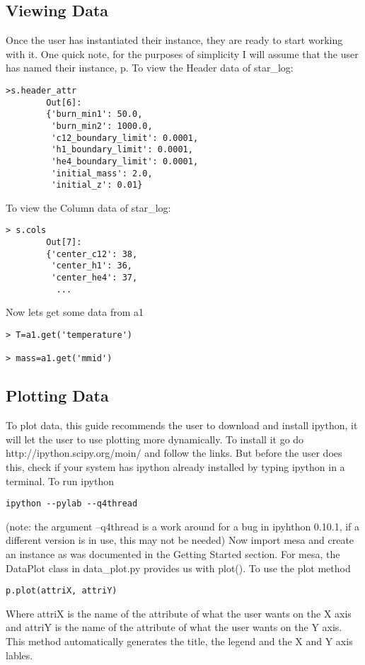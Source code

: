 \subsection{Viewing Data}
Once the user has instantiated their instance, they are ready to start working with it.
One quick note, for the purposes of simplicity I will assume that the user has named
their instance, p.
\newline
To view the Header data of star\_log:
\begin{verbatim}
>s.header_attr
        Out[6]: 
        {'burn_min1': 50.0,
         'burn_min2': 1000.0,
         'c12_boundary_limit': 0.0001,
         'h1_boundary_limit': 0.0001,
         'he4_boundary_limit': 0.0001,
         'initial_mass': 2.0,
         'initial_z': 0.01}
\end{verbatim}
To view the Column data of star\_log:
\begin{verbatim}
> s.cols
        Out[7]: 
        {'center_c12': 38,
         'center_h1': 36,
         'center_he4': 37,
          ...
\end{verbatim}
Now lets get some data from a1
\begin{verbatim}
> T=a1.get('temperature')

> mass=a1.get('mmid')
\end{verbatim}
\subsection{Plotting Data}
To plot data, this guide recommends the user to download and install ipython, it will let the user to use plotting more dynamically. To install it go do http://ipython.scipy.org/moin/ and follow the links.
But before the user does this, check if your system has ipython already installed by typing ipython in a terminal.
\newline
To run ipython
\begin{verbatim}
ipython --pylab --q4thread
\end{verbatim}
(note: the argument --q4thread is a work around for a bug in ipyhthon 0.10.1, if a different version is in use, this may not be needed)
\newline
Now import mesa and create an instance as was documented in the Getting Started section.
For mesa, the DataPlot class in  data\_plot.py provides us with plot().
\newline
To use the plot method
\begin{verbatim}
p.plot(attriX, attriY)
\end{verbatim}
Where attriX is the name of the attribute of what the user wants on the X axis and attriY is the name of the attribute of what the user wants on the Y axis.
This method automatically generates the title, the legend and the X and Y axis lables.

